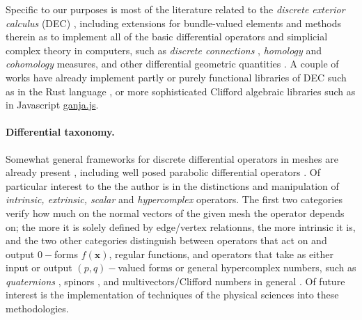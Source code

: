 \spa

Specific to our purposes is most of the literature related to
the \textit{discrete exterior calculus} (DEC) 
\cite{Wang:2023:ECIG, Pt_kov__2021_exterior}, including
extensions for bundle-valued elements \cite{braune2025discreteexteriorcalculusbundlevalued}
and methods 
therein as to implement all of the basic differential operators and
simplicial complex theory in computers, such as
\textit{discrete connections} \cite{Crane:2010:TCD},
\textit{homology} \cite{homology_discrete, dean_homology} and \textit{cohomology} measures,
and other differential geometric quantities \cite{algebraic_topology}.
A couple of works have already implement partly or purely functional libraries
of DEC such as in the Rust language \cite{wirth2025rustimplementationfiniteelement},
or more sophisticated Clifford algebraic libraries such as in Javascript
\href{https://github.com/enkimute/ganja.js}{ganja.js}.

\spa

\paragraph{Differential taxonomy.}
Somewhat general frameworks for discrete differential operators
in meshes are already present
\cite{discrete_operators, discrete_operator2, discrete_operators3}, including well posed
parabolic differential operators \cite{Parabolic_Discrete}.
Of particular interest to the the author is in the distinctions
and manipulation of \textit{intrinsic, extrinsic, scalar} and \textit{hypercomplex}
operators. The first two categories verify how much on the normal vectors of the
given mesh the operator depends on; the more it is solely defined
by edge/vertex relationns, the more intrinsic it is, and the two
other categories distinguish between operators that act on and
output
$0-$forms $f(\mathbf{x})$, regular functions, and operators that take as either
input or output $(p,q)-$valued forms or general hypercomplex numbers, such
as \textit{quaternions} \cite{Crane:2011:STD, conformal_chern, palmer2021framefieldoperators}, spinors
\cite{Liu:2017:DOE, spinorsMesh}, and multivectors/Clifford
numbers in general \cite{discrete_clifford, budinich2018clifford, discrete_clifford2,360iMarket2025ComputerGraphics, Hypercomplex_discrete}.
Of future interest is the implementation of techniques of the physical
sciences \cite{krasilshchik1998homologicalmethodsequationsmathematical}
into these methodologies.

\spa

